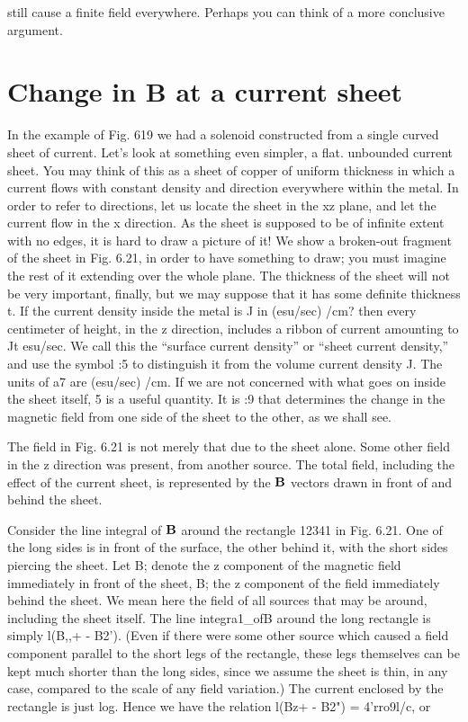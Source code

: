 still cause a finite field everywhere. Perhaps you can think of a more conclusive
argument.

\section{Change in B at a current sheet}

In the example of Fig. 619 we had a solenoid constructed from a
single curved sheet of current. Let's look at something even simpler,
a flat. unbounded current sheet. You may think of this as a sheet
of copper of uniform thickness in which a current flows with constant
density and direction everywhere within the metal. In order to refer
to directions, let us locate the sheet in the xz plane, and let the current
flow in the x direction. As the sheet is supposed to be of infinite extent
with no edges, it is hard to draw a picture of it! We show a
broken-out fragment of the sheet in Fig. 6.21, in order to have something
to draw; you must imagine the rest of it extending over the
whole plane. The thickness of the sheet will not be very important,
finally, but we may suppose that it has some definite thickness t. If
the current density inside the metal is J in (esu/sec) /cm? then every
centimeter of height, in the z direction, includes a ribbon of current
amounting to Jt esu/sec. We call this the ``surface current density''
or ``sheet current density,'' and use the symbol :5 to distinguish it from
the volume current density J. The units of a7 are (esu/sec) /cm. If
we are not concerned with what goes on inside the sheet itself, 5 is
a useful quantity. It is :9 that determines the change in the magnetic
field from one side of the sheet to the other, as we shall see.

The field in Fig. 6.21 is not merely that due to the sheet alone.
Some other field in the z direction was present, from another source.
The total field, including the effect of the current sheet, is represented
by the $\mathbf{B}$ vectors drawn in front of and behind the sheet.

Consider the line integral of $\mathbf{B}$ around the rectangle 12341 in
Fig. 6.21. One of the long sides is in front of the surface, the other
behind it, with the short sides piercing the sheet. Let B; denote the
z component of the magnetic field immediately in front of the sheet,
B; the z component of the field immediately behind the sheet. We
mean here the field of all sources that may be around, including the
sheet itself. The line integra1_ofB around the long rectangle is simply
l(B,,+ - B2'). (Even if there were some other source which caused
a field component parallel to the short legs of the rectangle, these
legs themselves can be kept much shorter than the long sides, since
we assume the sheet is thin, in any case, compared to the scale of any
field variation.) The current enclosed by the rectangle is just log.
Hence we have the relation l(Bz+ - B2") = 4'rro9l/c, or

